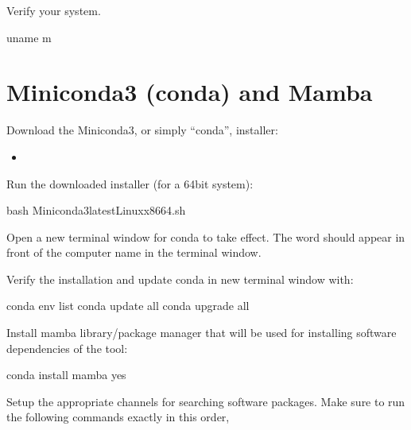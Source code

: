\documentclass[letterpaper,10pt,english]{sphinxhowto}
\begin{document}
\sphinxAtStartPar
Verify your system.

\begin{sphinxVerbatim}[commandchars=\\\{\}]
\PYGZdl{} uname \PYGZhy{}m
\end{sphinxVerbatim}


\section{Miniconda3 (conda) and Mamba}
\label{\detokenize{index:miniconda3-conda-and-mamba}}
\sphinxAtStartPar
Download the Miniconda3, or simply “conda”, installer:
\begin{itemize}
\item {} 
\sphinxAtStartPar
{}

\end{itemize}

\sphinxAtStartPar
Run the downloaded installer (for a 64\sphinxhyphen{}bit system):

\begin{sphinxVerbatim}[commandchars=\\\{\}]
\PYGZdl{} bash Miniconda3\PYGZhy{}latest\PYGZhy{}Linux\PYGZhy{}x86\PYGZus{}64.sh
\end{sphinxVerbatim}

\sphinxAtStartPar
Open a new terminal window for conda to take effect. The word  should appear in front of the computer name in the terminal window.

\sphinxAtStartPar
Verify the installation and update conda in new terminal window with:

\begin{sphinxVerbatim}[commandchars=\\\{\}]
\PYGZdl{} conda env list
\PYGZdl{} conda update \PYGZhy{}\PYGZhy{}all
\PYGZdl{} conda upgrade \PYGZhy{}\PYGZhy{}all
\end{sphinxVerbatim}

\sphinxAtStartPar
Install mamba library/package manager that will be used for installing software dependencies of the tool:

\begin{sphinxVerbatim}[commandchars=\\\{\}]
\PYGZdl{} conda install mamba \PYGZhy{}\PYGZhy{}yes
\end{sphinxVerbatim}

\sphinxAtStartPar
Setup the appropriate channels for searching software packages. Make sure to run the following commands exactly in this order,
\end{document}
